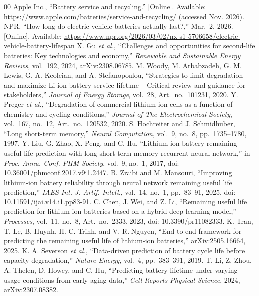 \documentclass[conference]{IEEEtran}
\begin{document}
\begin{thebibliography}{00}
 Apple Inc., ``Battery service and recycling.'' [Online]. Available: \url{https://www.apple.com/batteries/service-and-recycling/} (accessed Nov. 2026).
 NPR, ``How long do electric vehicle batteries actually last?,'' Mar.~2, 2026. [Online]. Available: \url{https://www.npr.org/2026/03/02/nx-s1-5706658/electric-vehicle-battery-lifespan}
 X. Gu \emph{et al.}, ``Challenges and opportunities for second-life batteries: Key technologies and economy,'' \emph{Renewable and Sustainable Energy Reviews}, vol.~192, 2024, arXiv:2308.06786.
 M. Woody, M. Arbabzadeh, G. M. Lewis, G. A. Keoleian, and A. Stefanopoulou, ``Strategies to limit degradation and maximize Li-ion battery service lifetime -- Critical review and guidance for stakeholders,'' \emph{Journal of Energy Storage}, vol.~28, Art.~no.~101231, 2020.
 Y. Preger \emph{et al.}, ``Degradation of commercial lithium-ion cells as a function of chemistry and cycling conditions,'' \emph{Journal of The Electrochemical Society}, vol.~167, no.~12, Art.~no.~120532, 2020.
 S. Hochreiter and J. Schmidhuber, ``Long short-term memory,'' \emph{Neural Computation}, vol.~9, no.~8, pp.~1735--1780, 1997.
 Y. Liu, G. Zhao, X. Peng, and C. Hu, ``Lithium-ion battery remaining useful life prediction with long short-term memory recurrent neural network,'' in \emph{Proc. Annu. Conf. PHM Society}, vol.~9, no.~1, 2017, doi: 10.36001/phmconf.2017.v9i1.2447.
 B. Zraibi and M. Mansouri, ``Improving lithium-ion battery reliability through neural network remaining useful life prediction,'' \emph{IAES Int. J. Artif. Intell.}, vol.~14, no.~1, pp.~83--91, 2025, doi: 10.11591/ijai.v14.i1.pp83-91.
 C. Chen, J. Wei, and Z. Li, ``Remaining useful life prediction for lithium-ion batteries based on a hybrid deep learning model,'' \emph{Processes}, vol.~11, no.~8, Art.~no.~2333, 2023, doi: 10.3390/pr11082333.
 K. Tran, T. Le, B. Huynh, H.-C. Trinh, and V.-R. Nguyen, ``End-to-end framework for predicting the remaining useful life of lithium-ion batteries,'' arXiv:2505.16664, 2025.
 K. A. Severson \emph{et al.}, ``Data-driven prediction of battery cycle life before capacity degradation,'' \emph{Nature Energy}, vol.~4, pp.~383--391, 2019.
 T. Li, Z. Zhou, A. Thelen, D. Howey, and C. Hu, ``Predicting battery lifetime under varying usage conditions from early aging data,'' \emph{Cell Reports Physical Science}, 2024, arXiv:2307.08382.

\end{thebibliography}
\end{document}
